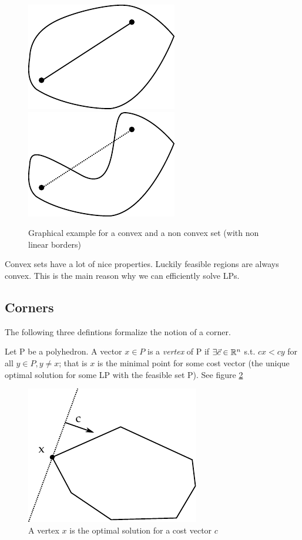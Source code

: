 \begin{figure}[hbt]
\begin{center}
\includegraphics{./images/convex.pdf}\hspace{2cm}
\includegraphics{./images/notConvex.pdf}
\end{center}
\caption{Graphical example for a convex and a non convex set (with non linear borders)}
\label{Fig:convexNotConvex}
\end{figure}

Convex sets have a lot of nice properties. Luckily feasible regions are always convex. This is the main reason why we can efficiently solve LPs. 

\subsection*{Corners}
The following three defintions formalize the notion of a corner.

\begin{Def}[Vertex]\label{Def:Vertex} Let P be a polyhedron. A vector $x\in P$ is a \emph{vertex} of P if $\exists \vec c\in \mathbb{R}^n$
 s.t. $cx < cy$ for all $y\in P, y \neq x $; that is $x$ is the minimal point for some cost vector (the unique optimal solution for some LP with the feasible set P). See figure \ref{Fig:vertex}
\end{Def}

\begin{figure}[hbt]
\begin{center}
\includegraphics{./images/vertex.pdf}
\end{center}
\caption{A vertex $x$ is the optimal solution for a cost vector $c$}
\label{Fig:vertex}
\end{figure}

